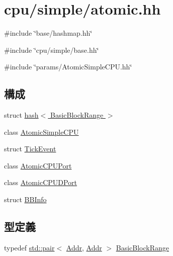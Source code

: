 \hypertarget{atomic_8hh}{
\section{cpu/simple/atomic.hh}
\label{atomic_8hh}
}
{\ttfamily \#include \char`\"{}base/hashmap.hh\char`\"{}}\par
{\ttfamily \#include \char`\"{}cpu/simple/base.hh\char`\"{}}\par
{\ttfamily \#include \char`\"{}params/AtomicSimpleCPU.hh\char`\"{}}\par
\subsection*{構成}
\begin{DoxyCompactItemize}
\item 
struct \hyperlink{structhash_3_01BasicBlockRange_01_4}{hash$<$ BasicBlockRange $>$}
\item 
class \hyperlink{classAtomicSimpleCPU}{AtomicSimpleCPU}
\item 
struct \hyperlink{structAtomicSimpleCPU_1_1TickEvent}{TickEvent}
\item 
class \hyperlink{classAtomicSimpleCPU_1_1AtomicCPUPort}{AtomicCPUPort}
\item 
class \hyperlink{classAtomicSimpleCPU_1_1AtomicCPUDPort}{AtomicCPUDPort}
\item 
struct \hyperlink{structAtomicSimpleCPU_1_1BBInfo}{BBInfo}
\end{DoxyCompactItemize}
\subsection*{型定義}
\begin{DoxyCompactItemize}
\item 
typedef \hyperlink{classstd_1_1pair}{std::pair}$<$ \hyperlink{base_2types_8hh_af1bb03d6a4ee096394a6749f0a169232}{Addr}, \hyperlink{base_2types_8hh_af1bb03d6a4ee096394a6749f0a169232}{Addr} $>$ \hyperlink{atomic_8hh_aa63e4e0e926d882e71c1af09578986e1}{BasicBlockRange}
\end{DoxyCompactItemize}


